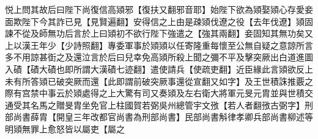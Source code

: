 悦上問其故后曰陛下尚復信高熲邪【復扶又翻邪音耶】始陛下欲為熲娶熲心存愛妾面欺陛下今其詐已見【見賢遍翻】安得信之上由是疎熲伐遼之役【去年伐遼】熲固諫不從及師無功后言於上曰熲初不欲行陛下強遣之【強其兩翻】妾固知其無功矣又上以漢王年少【少詩照翻】專委軍事於熲熲以任寄隆重每懷至公無自疑之意諒所言多不用諒甚衘之及還泣言於后曰兒幸免高熲所殺上聞之彌不平及擊突厥出白道進圖入磧【磧大磧也即所謂大漢磧七迹翻】遣使請兵【使疏吏翻】近臣緣此言熲欲反上未有所答熲已破突厥而還【此即謂前破突厥事還從宣翻又如字】及王世積誅推覈之際有宫禁中事云於熲處得之上大驚有司又奏熲及左右衛大將軍元旻元胄並與世積交通受其名馬之贈旻胄坐免官上柱國賀若弼吳州總管宇文㢸【若人者翻㢸古弼字】刑部尚書薛胄【開皇三年改都官尚書為刑部尚書】民部尚書斛律孝卿兵部尚書柳述等明熲無罪上愈怒皆以屬吏【屬之
